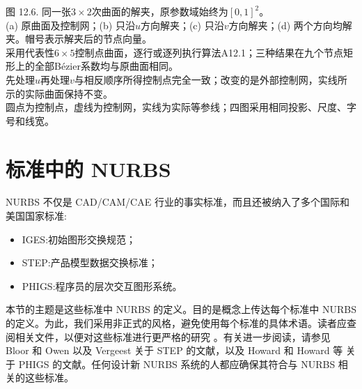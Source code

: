 \documentclass[../main.tex]{subfiles}
\begin{document}
\begin{center}
\begin{minipage}{37cm}
\centering
\begin{minipage}{16cm}\centering
{}
\end{minipage}%
\hspace{1cm}%
\begin{minipage}{16cm}\centering
{}
\end{minipage}%
\par\medskip
{}
\par\smallskip
图 12.6. 同一张$3\times2$次曲面的解夹，原参数域始终为$[0,1]^2$。\\
(a) 原曲面及控制网；(b) 只沿$u$方向解夹；(c) 只沿$v$方向解夹；(d) 两个方向均解夹。帽号表示解夹后的节点向量。\\
采用代表性$6\times5$控制点曲面，逐行或逐列执行算法A12.1；三种结果在九个节点矩形上的全部B\'{e}zier系数均与原曲面相同。\\
先处理$u$再处理$v$与相反顺序所得控制点完全一致；改变的是外部控制网，实线所示的实际曲面保持不变。\\
圆点为控制点，虚线为控制网，实线为实际等参线；四图采用相同投影、尺度、字号和线宽。
\end{minipage}
\end{center}

\section{标准中的 NURBS }

NURBS 不仅是 CAD/CAM/CAE 行业的事实标准，而且还被纳入了多个国际和美国国家标准:

\begin{itemize}
\item IGES:初始图形交换规范；
\end{itemize}

\begin{itemize}
\item STEP:产品模型数据交换标准；
\end{itemize}

\begin{itemize}
\item PHIGS:程序员的层次交互图形系统。
\end{itemize}

本节的主题是这些标准中 NURBS 的定义。目的是概念上传达每个标准中 NURBS 的定义。为此，我们采用非正式的风格，避免使用每个标准的具体术语。读者应查阅相关文件，以便对这些标准进行更严格的研究 \cite{PHIG92,IGE93,STEP94}。有关进一步阅读，请参见 Bloor 和 Owen \cite{Blor91} 以及 Vergeest \cite{Verg91} 关于 STEP 的文献，以及 Howard \cite{Howa91a} 和 Howard 等 \cite{Howa91b} 关于 PHIGS 的文献。任何设计新 NURBS 系统的人都应确保其符合与 NURBS 相关的这些标准。
\end{document}
